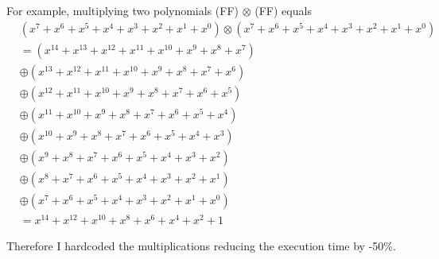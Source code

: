 \documentclass[runningheads,a4paper]{llncs}
\begin{document}
For example, multiplying two polynomials (FF) $\otimes$ (FF) equals
\begin{align*}
&(x^7  + x^6  + x^5  + x^4  + x^3  + x^2 + x^1 + x^0) \otimes (x^7 + x^6 + x^5 + x^4 + x^3 + x^2 + x^1 + x^0) \\
& = (x^{14} + x^{13} + x^{12} + x^{11} + x^{10} + x^9 + x^8 + x^7) \\
& \oplus      (x^{13} + x^{12} + x^{11} + x^{10} + x^9 + x^8 + x^7 + x^6) \\
& \oplus             (x^{12} + x^{11} + x^{10} + x^9 + x^8 + x^7 + x^6 + x^5) \\
& \oplus                    (x^{11} + x^{10} + x^9 + x^8 + x^7 + x^6 + x^5 + x^4) \\
& \oplus                           (x^{10} + x^9 + x^8 + x^7 + x^6 + x^5 + x^4 + x^3) \\
& \oplus                                  (x^9 + x^8 + x^7 + x^6 + x^5 + x^4 + x^3 + x^2)\\
& \oplus                                        (x^8 + x^7 + x^6 + x^5 + x^4 + x^3 + x^2 + x^1) \\
& \oplus                                              (x^7 + x^6 + x^5 + x^4 + x^3 + x^2 + x^1 + x^0) \\
& = x^{14} + x^{12} + x^{10} + x^8 + x^6 + x^4 + x^2 + 1
\end{align*}

Therefore I hardcoded the multiplications reducing the execution time by -50\%. 
\end{document}
